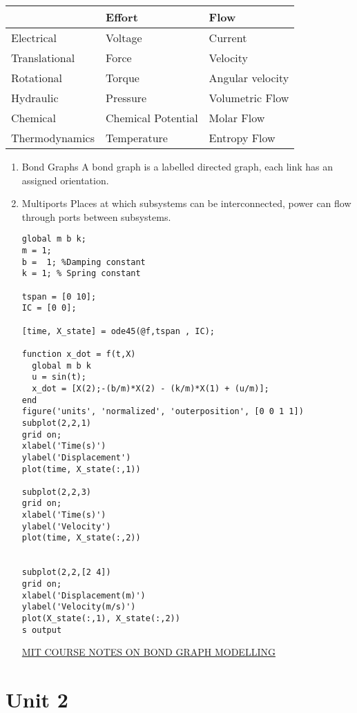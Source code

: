 \documentclass[11pt]{report}
\begin{document}
\begin{center}
\begin{tabular}{lll}
\hline
 & Effort & Flow\\
\hline
Electrical & Voltage & Current\\
Translational & Force & Velocity\\
Rotational & Torque & Angular velocity\\
Hydraulic & Pressure & Volumetric Flow\\
Chemical & Chemical Potential & Molar Flow\\
Thermodynamics & Temperature & Entropy Flow\\
\hline
\end{tabular}
\end{center}
\begin{enumerate}
\item Bond Graphs
\label{sec:orgdcf9d02}
A bond graph is a labelled directed graph, each link has an assigned orientation.
\item Multiports
\label{sec:orgd64853d}
Places at which subsystems can be interconnected, power can flow through ports between subsystems.

\begin{verbatim}
global m b k;
m = 1;
b =  1; %Damping constant
k = 1; % Spring constant

tspan = [0 10];
IC = [0 0];

[time, X_state] = ode45(@f,tspan , IC);

function x_dot = f(t,X)
  global m b k
  u = sin(t);
  x_dot = [X(2);-(b/m)*X(2) - (k/m)*X(1) + (u/m)];
end
figure('units', 'normalized', 'outerposition', [0 0 1 1])
subplot(2,2,1)
grid on;
xlabel('Time(s)')
ylabel('Displacement')
plot(time, X_state(:,1))

subplot(2,2,3)
grid on;
xlabel('Time(s)')
ylabel('Velocity')
plot(time, X_state(:,2))


subplot(2,2,[2 4])
grid on;
xlabel('Displacement(m)')
ylabel('Velocity(m/s)')
plot(X_state(:,1), X_state(:,2))
s output
\end{verbatim}

\href{https://ocw.mit.edu/courses/2-141-modeling-and-simulation-of-dynamic-systems-fall-2006/71ca8916669d0aa6839ce780db9f5288\_bond\_graph\_intro.pdf}{MIT COURSE NOTES ON BOND GRAPH MODELLING}
\end{enumerate}
\chapter{Unit 2}
\label{sec:org3ff8ff5}
\end{document}
